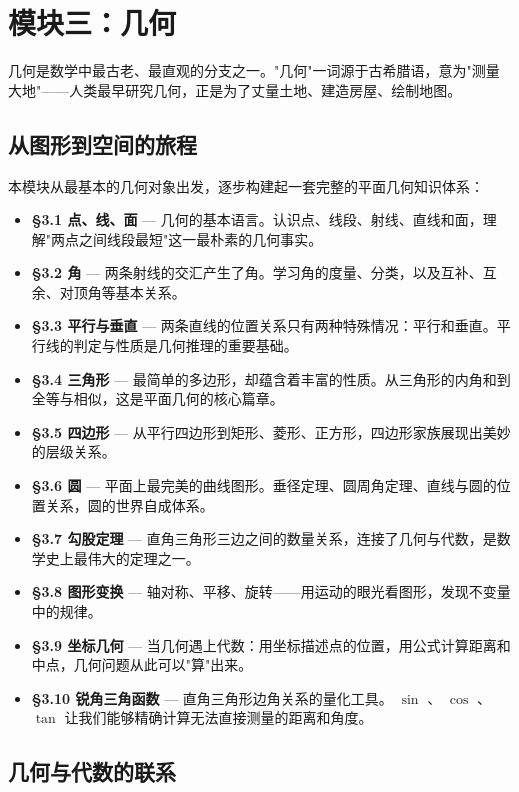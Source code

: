 \chapter*{模块三：几何}


几何是数学中最古老、最直观的分支之一。"几何"一词源于古希腊语，意为"测量大地"——人类最早研究几何，正是为了丈量土地、建造房屋、绘制地图。

\section*{从图形到空间的旅程}


本模块从最基本的几何对象出发，逐步构建起一套完整的平面几何知识体系：

\begin{itemize}
  \item \textbf{§3.1 点、线、面} — 几何的基本语言。认识点、线段、射线、直线和面，理解"两点之间线段最短"这一最朴素的几何事实。
  \item \textbf{§3.2 角} — 两条射线的交汇产生了角。学习角的度量、分类，以及互补、互余、对顶角等基本关系。
  \item \textbf{§3.3 平行与垂直} — 两条直线的位置关系只有两种特殊情况：平行和垂直。平行线的判定与性质是几何推理的重要基础。
  \item \textbf{§3.4 三角形} — 最简单的多边形，却蕴含着丰富的性质。从三角形的内角和到全等与相似，这是平面几何的核心篇章。
  \item \textbf{§3.5 四边形} — 从平行四边形到矩形、菱形、正方形，四边形家族展现出美妙的层级关系。
  \item \textbf{§3.6 圆} — 平面上最完美的曲线图形。垂径定理、圆周角定理、直线与圆的位置关系，圆的世界自成体系。
  \item \textbf{§3.7 勾股定理} — 直角三角形三边之间的数量关系，连接了几何与代数，是数学史上最伟大的定理之一。
  \item \textbf{§3.8 图形变换} — 轴对称、平移、旋转——用运动的眼光看图形，发现不变量中的规律。
  \item \textbf{§3.9 坐标几何} — 当几何遇上代数：用坐标描述点的位置，用公式计算距离和中点，几何问题从此可以"算"出来。
  \item \textbf{§3.10 锐角三角函数} — 直角三角形边角关系的量化工具。 $\sin$ 、 $\cos$ 、 $\tan$ 让我们能够精确计算无法直接测量的距离和角度。
\end{itemize}


\section*{几何与代数的联系}


